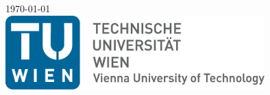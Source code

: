 \begin{titlepage}

\vfill
\null

{\large \today}\\[1cm] %



\includegraphics[width=0.75\textwidth]{figures/uni_titlepage}\\ %
 

\vfill %

\end{titlepage}